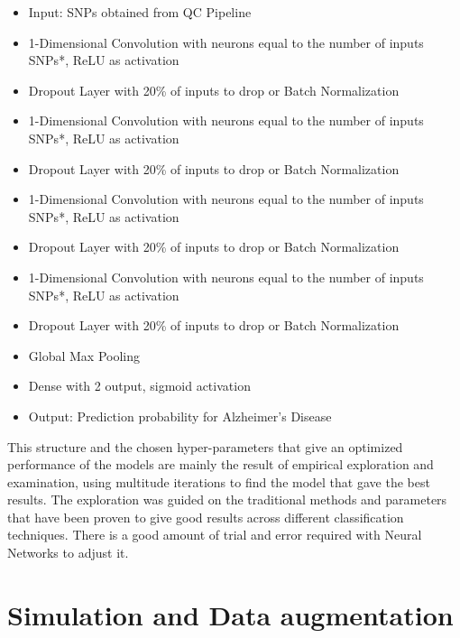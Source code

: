 \begin{itemize}
    \item{Input: SNPs obtained from QC Pipeline
    }
    \item{1-Dimensional Convolution with  neurons equal to the number of inputs SNPs*, ReLU as activation}
    \item{Dropout Layer with 20\% of inputs to drop or Batch Normalization}
    \item{1-Dimensional Convolution with  neurons equal to the number of inputs SNPs*, ReLU as activation}
    \item{Dropout Layer with 20\% of inputs to drop or Batch Normalization}
    \item{1-Dimensional Convolution with  neurons equal to the number of inputs SNPs*, ReLU as activation}
    \item{Dropout Layer with 20\% of inputs to drop or Batch Normalization}
    \item{1-Dimensional Convolution with  neurons equal to the number of inputs SNPs*, ReLU as activation}
    \item{Dropout Layer with 20\% of inputs to drop or Batch Normalization}
    \item{Global Max Pooling}
    \item{Dense with 2 output, sigmoid activation}
    \item{Output: Prediction probability for Alzheimer's Disease}
\end{itemize}

This structure and the chosen hyper-parameters that give an optimized performance of the models are mainly the result of empirical exploration and examination, using multitude iterations to find the model that gave the best results. The exploration was guided on the traditional methods and parameters that have been proven to give good results across different classification techniques. There is a good amount of trial and error required with Neural Networks to adjust it.



\section{Simulation and Data augmentation}

